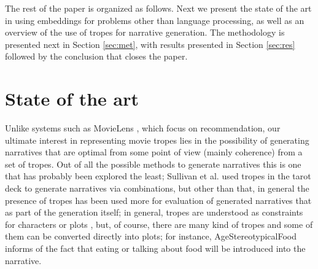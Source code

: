 \documentclass[letterpaper]{article}
\begin{document}

	
	
	
The rest of the paper is organized as follows. Next we present the
state of the art in using embeddings for problems other than language
processing, as well as an overview of the use of tropes for narrative
generation. The methodology is presented next in Section
\ref{sec:met}, with results presented in Section \ref{sec:res}
followed by the conclusion that closes the paper.

        
\section{State of the art}

Unlike systems such as MovieLens \cite{10.1145/2827872}, which focus
on recommendation, our ultimate
interest in representing movie tropes lies in the possibility of
generating narratives \cite{10.5555/931357} that are optimal from some point of view (mainly
coherence) from a set of tropes. Out of all the possible methods to
generate narratives \cite{van2019narrative} this is one that has
probably been explored the least; Sullivan et
al. \cite{10.1145/3235765.3235819} used tropes in the tarot deck to
generate narratives via combinations, but other than that, in general
the presence of tropes has been used more for evaluation of generated
narratives \cite{gervas2012story} that as part of the generation
itself; in general, tropes are understood as constraints for
characters or plots \cite{Thompson18NarrativeEvents}, but, of course,
there are many kind of tropes and some of them can be converted
directly into plots; for instance, {\sf AgeStereotypicalFood} informs
of the fact that eating or talking about food will be introduced into
the narrative.
\end{document}
